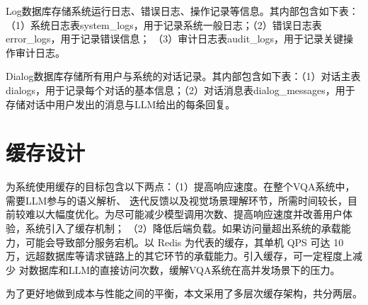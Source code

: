 \begin{table}[h]
    \centering
    \renewcommand{\arraystretch}{1.3} %
    \caption{rule\_condition表字段设置及说明}
    \label{tab:rule_conditions}
\end{table}

Log数据库存储系统运行日志、错误日志、操作记录等信息。其内部包含如下表：（1）系统日志表system\_logs，用于记录系统一般日志；（2）错误日志表error\_logs，用于记录错误信息；
（3）审计日志表audit\_logs，用于记录关键操作审计日志。

Dialog数据库存储所有用户与系统的对话记录。其内部包含如下表：（1）对话主表dialogs，用于记录每个对话的基本信息；（2）对话消息表dialog\_messages，用于
存储对话中用户发出的消息与LLM给出的每条回复。

\section{缓存设计}
为系统使用缓存的目标包含以下两点：（1）提高响应速度。在整个VQA系统中，需要LLM参与的语义解析、
迭代反馈以及视觉场景理解环节，所需时间较长，目前较难以大幅度优化。为尽可能减少模型调用次数、提高响应速度并改善用户体验，系统引入了缓存机制；
（2）降低后端负载。如果访问量超出系统的承载能力，可能会导致部分服务宕机。以 Redis 为代表的缓存，其单机 QPS 可达 10 万，远超数据库等请求链路上的其它环节的承载能力。引入缓存，可一定程度上减少
对数据库和LLM的直接访问次数，缓解VQA系统在高并发场景下的压力。

为了更好地做到成本与性能之间的平衡，本文采用了多层次缓存架构，共分两层。

